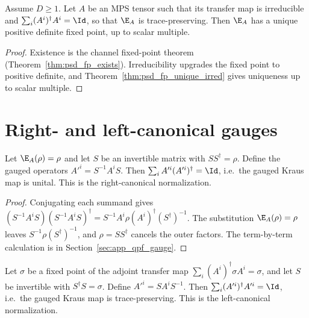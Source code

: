 \begin{theorem}
    \label{thm:qpf_irreducible}
    \leanok
    Assume $D\ge 1$. Let $A$ be an MPS tensor such that its transfer map is
    irreducible and $\sum_i (A^i)^\dagger A^i=\Id$, so that $\E_A$ is
    trace-preserving.
    Then $\E_A$ has a unique positive definite fixed point, up to scalar
    multiple.
\end{theorem}

\begin{proof}\leanok
    Existence is the channel fixed-point theorem
    (Theorem~\ref{thm:psd_fp_exists}). Irreducibility upgrades the fixed point
    to positive definite, and Theorem~\ref{thm:psd_fp_unique_irred} gives
    uniqueness up to scalar multiple.
\end{proof}

\section{Right- and left-canonical gauges}

\begin{theorem}\label{thm:right_canonical_gauge}
    \leanok
    Let $\E_A(\rho) = \rho$ and let $S$ be an invertible matrix with
    $SS^\dagger = \rho$.
    Define the gauged operators $A'^i = S^{-1}A^iS$.
    Then $\sum_i A'^i(A'^i)^\dagger = \Id$, i.e.\ the gauged
    Kraus map is unital. This is the right-canonical normalization.
\end{theorem}

\begin{proof}\leanok
    Conjugating each summand gives
    $(S^{-1}A^iS)(S^{-1}A^iS)^\dagger
        =S^{-1}A^i\rho(A^i)^\dagger(S^\dagger)^{-1}$.
    The substitution $\E_A(\rho)=\rho$ leaves
    $S^{-1}\rho(S^\dagger)^{-1}$, and $\rho=SS^\dagger$ cancels the
    outer factors. The term-by-term calculation is in
    Section~\ref{sec:app_qpf_gauge}.
\end{proof}

\begin{theorem}\label{thm:left_canonical_gauge}
    \leanok
    Let $\sigma$ be a fixed point of the adjoint transfer map
    $\sum_i (A^i)^\dagger \sigma A^i = \sigma$,
    and let $S$ be invertible with $S^\dagger S = \sigma$.
    Define $A'^i = SA^iS^{-1}$.
    Then $\sum_i (A'^i)^\dagger A'^i = \Id$, i.e.\ the gauged
    Kraus map is trace-preserving. This is the left-canonical
    normalization.
\end{theorem}

